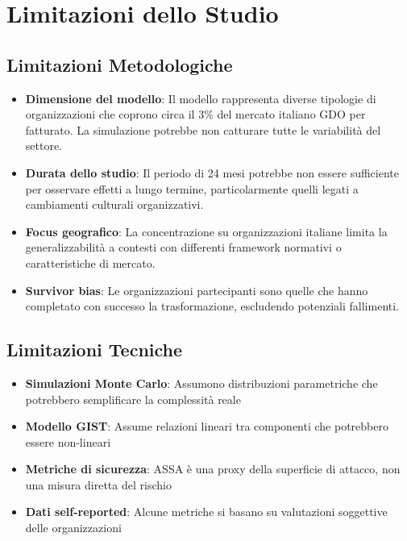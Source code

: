 \section{\texorpdfstring{Limitazioni dello Studio}{D.3 - Limitazioni dello Studio}}

\subsection{\texorpdfstring{Limitazioni Metodologiche}{D.3.1 - Limitazioni Metodologiche}}

\begin{itemize}
    \item \textbf{Dimensione del modello}: Il modello rappresenta diverse tipologie di organizzazioni che coprono circa il 3\% del mercato italiano GDO per fatturato. La simulazione potrebbe non catturare tutte le variabilità del settore.
    
    \item \textbf{Durata dello studio}: Il periodo di 24 mesi potrebbe non essere sufficiente per osservare effetti a lungo termine, particolarmente quelli legati a cambiamenti culturali organizzativi.
    
    \item \textbf{Focus geografico}: La concentrazione su organizzazioni italiane limita la generalizzabilità a contesti con differenti framework normativi o caratteristiche di mercato.
    
    \item \textbf{Survivor bias}: Le organizzazioni partecipanti sono quelle che hanno completato con successo la trasformazione, escludendo potenziali fallimenti.
\end{itemize}

\subsection{\texorpdfstring{Limitazioni Tecniche}{D.3.2 - Limitazioni Tecniche}}

\begin{itemize}
    \item \textbf{Simulazioni Monte Carlo}: Assumono distribuzioni parametriche che potrebbero semplificare la complessità reale
    \item \textbf{Modello GIST}: Assume relazioni lineari tra componenti che potrebbero essere non-lineari
    \item \textbf{Metriche di sicurezza}: ASSA è una proxy della superficie di attacco, non una misura diretta del rischio
    \item \textbf{Dati self-reported}: Alcune metriche si basano su valutazioni soggettive delle organizzazioni
\end{itemize}

